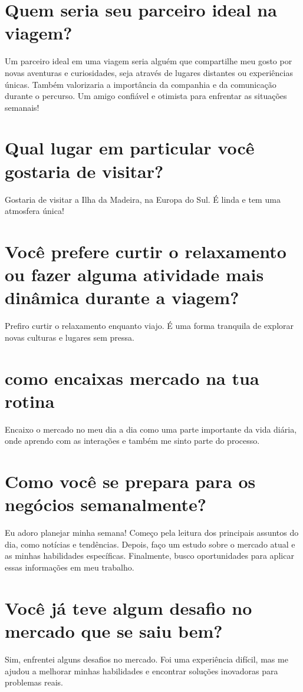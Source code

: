 \documentclass[11pt,a4paper]{article}
\begin{document}
\section{Quem seria seu parceiro ideal na viagem?}
Um parceiro ideal em uma viagem seria alguém que compartilhe meu gosto por novas aventuras e curiosidades, seja através de lugares distantes ou experiências únicas. Também valorizaria a importância da companhia e da comunicação durante o percurso. Um amigo confiável e otimista para enfrentar as situações semanais!

\section{Qual lugar em particular você gostaria de visitar?}
Gostaria de visitar a Ilha da Madeira, na Europa do Sul. É linda e tem uma atmosfera única!

\section{Você prefere curtir o relaxamento ou fazer alguma atividade mais dinâmica durante a viagem?}
Prefiro curtir o relaxamento enquanto viajo. É uma forma tranquila de explorar novas culturas e lugares sem pressa.

\section{como encaixas mercado na tua rotina}
Encaixo o mercado no meu dia a dia como uma parte importante da vida diária, onde aprendo com as interações e também me sinto parte do processo.

\section{Como você se prepara para os negócios semanalmente?}
Eu adoro planejar minha semana! Começo pela leitura dos principais assuntos do dia, como notícias e tendências. Depois, faço um estudo sobre o mercado atual e as minhas habilidades específicas. Finalmente, busco oportunidades para aplicar essas informações em meu trabalho.

\section{Você já teve algum desafio no mercado que se saiu bem?}
Sim, enfrentei alguns desafios no mercado. Foi uma experiência difícil, mas me ajudou a melhorar minhas habilidades e encontrar soluções inovadoras para problemas reais.
\end{document}
